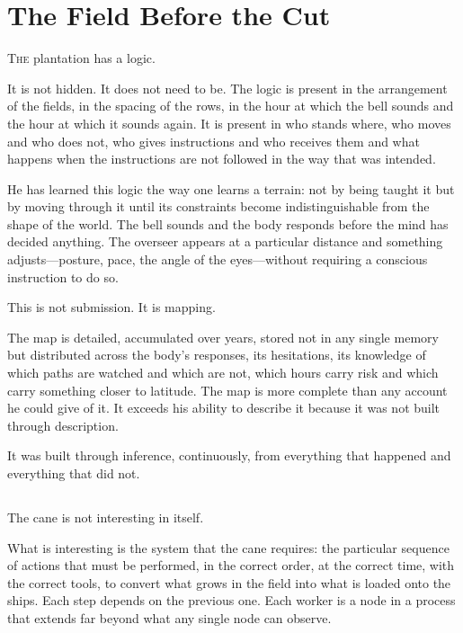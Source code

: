 
\chapter{The Field Before the Cut}


\lettrine{T}{he} plantation has a logic.

It is not hidden. It does not need to be. The logic is present in
the arrangement of the fields, in the spacing of the rows, in the
hour at which the bell sounds and the hour at which it sounds
again. It is present in who stands where, who moves and who does
not, who gives instructions and who receives them and what happens
when the instructions are not followed in the way that was
intended.

He has learned this logic the way one learns a terrain: not by
being taught it but by moving through it until its constraints
become indistinguishable from the shape of the world. The bell
sounds and the body responds before the mind has decided anything.
The overseer appears at a particular distance and something
adjusts---posture, pace, the angle of the eyes---without requiring
a conscious instruction to do so.

This is not submission. It is mapping.

The map is detailed, accumulated over years, stored not in any
single memory but distributed across the body's responses, its
hesitations, its knowledge of which paths are watched and which
are not, which hours carry risk and which carry something closer
to latitude. The map is more complete than any account he could
give of it. It exceeds his ability to describe it because it was
not built through description.

It was built through inference, continuously, from everything that
happened and everything that did not.

\section{}

The cane is not interesting in itself.

What is interesting is the system that the cane requires: the
particular sequence of actions that must be performed, in the
correct order, at the correct time, with the correct tools, to
convert what grows in the field into what is loaded onto the
ships. Each step depends on the previous one. Each worker is a
node in a process that extends far beyond what any single node
can observe.


